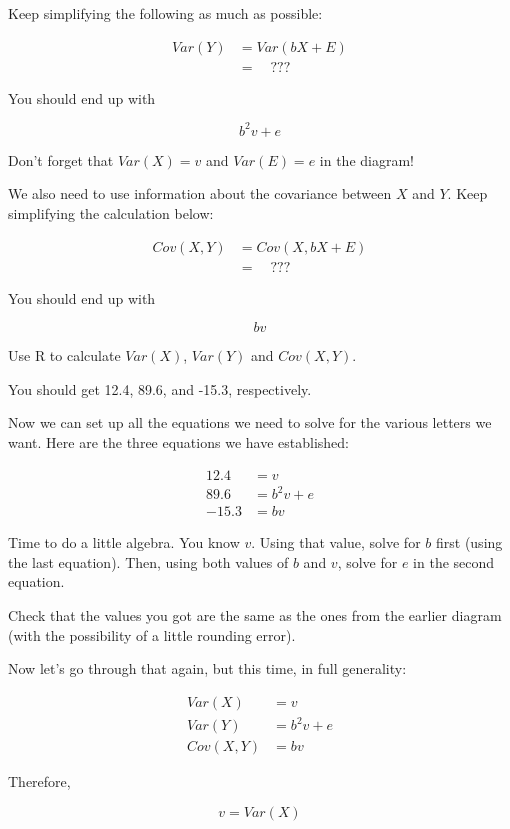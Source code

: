 \documentclass[
]{book}
\begin{document}
Keep simplifying the following as much as possible:

\begin{align}
Var(Y)  &= Var(bX + E) \\
        &= \quad ???
\end{align}

You should end up with

\[
b^{2}v + e
\]

Don't forget that \(Var(X) = v\) and \(Var(E) = e\) in the diagram!

We also need to use information about the covariance between \(X\) and \(Y\). Keep simplifying the calculation below:

\begin{align}
Cov(X, Y)  &= Cov(X, bX + E) \\
        &= \quad ???
\end{align}

You should end up with

\[
bv
\]

Use R to calculate \(Var(X)\), \(Var(Y)\) and \(Cov(X, Y)\).

You should get 12.4, 89.6, and -15.3, respectively.

Now we can set up all the equations we need to solve for the various letters we want. Here are the three equations we have established:

\begin{align}
12.4 &= v \\
89.6 &= b^2v + e \\
-15.3 &= bv
\end{align}

Time to do a little algebra. You know \(v\). Using that value, solve for \(b\) first (using the last equation). Then, using both values of \(b\) and \(v\), solve for \(e\) in the second equation.

Check that the values you got are the same as the ones from the earlier diagram (with the possibility of a little rounding error).

Now let's go through that again, but this time, in full generality:

\begin{align}
Var(X) &= v \\
Var(Y) &= b^2v + e \\
Cov(X, Y) &= bv
\end{align}

Therefore,

\[
v = Var(X)
\]
\end{document}

